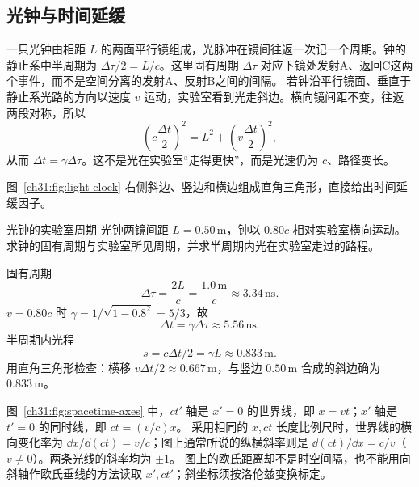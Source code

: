 
\subsection{光钟与时间延缓}

一只光钟由相距 $L$ 的两面平行镜组成，光脉冲在镜间往返一次记一个周期。钟的静止系中半周期为
$\Delta\tau/2=L/c$。这里固有周期 $\Delta\tau$ 对应下镜处发射A、返回C这两个事件，而不是空间分离的发射A、反射B之间的间隔。
若钟沿平行镜面、垂直于静止系光路的方向以速度 $v$ 运动，实验室看到光走斜边。横向镜间距不变，往返两段对称，所以
\begin{equation}
 \left(c\frac{\Delta t}{2}\right)^2
 =L^2+\left(v\frac{\Delta t}{2}\right)^2,
\end{equation}
从而 $\Delta t=\gamma\Delta\tau$。这不是光在实验室“走得更快”，而是光速仍为 $c$、路径变长。

\begin{center}

\label{ch31:fig:light-clock}
\end{center}
图~\ref{ch31:fig:light-clock} 右侧斜边、竖边和横边组成直角三角形，直接给出时间延缓因子。

\begin{origexamplebox}{光钟的实验室周期}
光钟两镜间距 $L=0.50\,\mathrm m$，钟以 $0.80c$ 相对实验室横向运动。求钟的固有周期与实验室所见周期，并求半周期内光在实验室走过的路程。
\end{origexamplebox}
\begin{xesolution}
固有周期
\[
 \Delta\tau=\frac{2L}{c}=\frac{1.0\,\mathrm m}{c}\approx3.34\,\mathrm{ns}.
\]
$v=0.80c$ 时 $\gamma=1/\sqrt{1-0.8^2}=5/3$，故
\[
 \boxed{\Delta t=\gamma\Delta\tau\approx5.56\,\mathrm{ns}}.
\]
半周期内光程
\[
 \boxed{s=c\Delta t/2=\gamma L\approx0.833\,\mathrm m}.
\]
用直角三角形检查：横移 $v\Delta t/2\approx0.667\,\mathrm m$，与竖边 $0.50\,\mathrm m$ 合成的斜边确为 $0.833\,\mathrm m$。
\end{xesolution}

\begin{center}

\label{ch31:fig:spacetime-axes}
\end{center}
图~\ref{ch31:fig:spacetime-axes} 中，$ct'$ 轴是 $x'=0$ 的世界线，即 $x=vt$；$x'$ 轴是 $t'=0$ 的同时线，即 $ct=(v/c)x$。
采用相同的 $x,ct$ 长度比例尺时，世界线的横向变化率为 $\dd x/\dd(ct)=v/c$；图上通常所说的纵横斜率则是 $\dd(ct)/\dd x=c/v$（$v\ne0$）。两条光线的斜率均为 $\pm1$。
图上的欧氏距离却不是时空间隔，也不能用向斜轴作欧氏垂线的方法读取 $x',ct'$；斜坐标须按洛伦兹变换标定。

